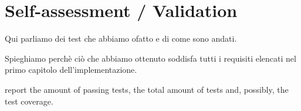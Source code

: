 \section{Self-assessment / Validation}

Qui parliamo dei test che abbiamo ofatto e di come sono andati. 

Spieghiamo perchè ciò che abbiamo ottenuto soddisfa tutti i requisiti elencati nel primo capitolo dell'implementazione.

 report the amount of passing tests, the total amount of tests and, possibly, the test coverage.
